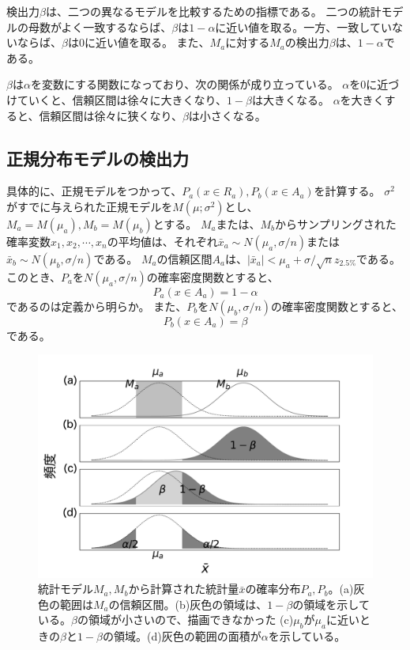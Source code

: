 検出力$\beta$は、二つの異なるモデルを比較するための指標である。
二つの統計モデルの母数がよく一致するならば、$\beta$は$1-\alpha$に近い値を取る。一方、一致していないならば、$\beta$は0に近い値を取る。
また、$M_a$に対する$M_a$の検出力$\beta$は、$1-\alpha$である。

$\beta$は$\alpha$を変数にする関数になっており、次の関係が成り立っている。
$\alpha$を0に近づけていくと、信頼区間は徐々に大きくなり、$1-\beta$は大きくなる。
$\alpha$を大きくすると、信頼区間は徐々に狭くなり、$\beta$は小さくなる。



\subsection{正規分布モデルの検出力}
具体的に、正規モデルをつかって、$P_a(x \in R_a),P_b(x \in A_a)$を計算する。
$\sigma^2$がすでに与えられた正規モデルを$M(\mu;\sigma^2)$とし、$M_a=M(\mu_a),M_b=M(\mu_b)$とする。
$M_a$または、$M_b$からサンプリングされた確率変数$x_1,x_2,\cdots,x_n$の平均値は、それぞれ$\bar{x}_a\sim N(\mu_a,\sigma/n)$または$\bar{x}_b\sim N(\mu_b,\sigma/n)$である。
$M_a$の信頼区間$A_a$は、$|\bar{x}_a|<\mu_a+\sigma / \sqrt{n}z_{2.5\%}$である。
このとき、$P_a$を$N(\mu_a,\sigma/n)$の確率密度関数とすると、
\begin{equation*}
    P_a(x \in A_a) = 1-\alpha
\end{equation*}
であるのは定義から明らか。
また、$P_b$を$N(\mu_b,\sigma/n)$の確率密度関数とすると、
\begin{equation*}
    P_b(x \in A_a ) = \beta
\end{equation*}
である。


\begin{figure}
\begin{center}
    \includegraphics[width=15cm]{./image/04_/power_of_a_test_2.pdf}
    \caption{統計モデル$M_a,M_b$から計算された統計量$\bar{x}$の確率分布$P_a,P_b$。(a)灰色の範囲は$M_a$の信頼区間。(b)灰色の領域は、$1-\beta$の領域を示している。$\beta$の領域が小さいので、描画できなかった (c)$\mu_b$が$\mu_a$に近いときの$\beta$と$1-\beta$の領域。(d)灰色の範囲の面積が$\alpha$を示している。}
    \label{fig:power_of_test_alpha_beta}
\end{center}
\end{figure}


